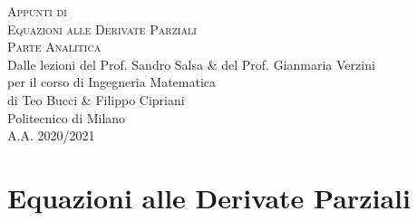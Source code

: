 \documentclass[10pt,a4paper,twoside,openright]{book}
\begin{document}
\frontmatter

\pagestyle{empty}


\hypertarget{mytitlepage}{} %

\vspace*{\fill}

\begin{center}
	{\large \textsc{Appunti di}}\\
	\vspace*{0.4cm}
	{\Huge \textsc{Equazioni alle Derivate Parziali}}\\
	\vspace*{0.3cm}
	{\huge \textsc{Parte Analitica}}\\
	\vspace*{1cm}
	{\large {Dalle lezioni del Prof. Sandro Salsa \& del Prof. Gianmaria Verzini}}\\
	\vspace*{0.1cm}
	{\large per il corso di Ingegneria Matematica}\\
	\vspace*{0.4cm}
	{\large {di Teo Bucci \& Filippo Cipriani}}\\
	\vspace*{1cm}
	Politecnico di Milano\\
	A.A. 2020/2021
\end{center}
\vspace*{\fill}
\clearpage


\hypertarget{mycopyright}{} %

\clearpage


% 


\cleardoublepage
\pagestyle{toc}
\hypertarget{mytoc}{} %
\bookmark[dest=mytoc,level=chapter]{\contentsname} %
\tableofcontents
\cleardoublepage


\pagestyle{fancy}
\mainmatter

\part{Equazioni alle Derivate Parziali}
\end{document}
